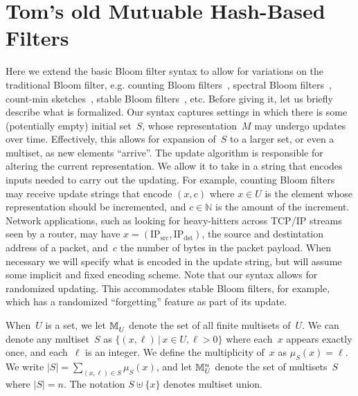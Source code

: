\section{Tom's old Mutuable Hash-Based Filters}
Here we extend the basic Bloom filter syntax to allow for variations on the traditional Bloom filter, e.g. counting Bloom filters~\cite{xxx}, spectral Bloom filters~\cite{xxx}, count-min sketches~\cite{xxx}, stable Bloom filters~\cite{xxx}, etc.   Before giving it, let us briefly describe what is formalized.  Our syntax captures settings in which there is some (potentially empty) initial set~$S$, whose representation~$M$ may undergo updates over time.  Effectively, this allows for expansion of~$S$ to a larger set, or even a multiset, as new elements ``arrive''.    The update algorithm is responsible for altering the current representation.  We allow it to take in a string that encodes inputs needed to carry out the updating.  For example, counting Bloom filters may receive update strings that encode $(x,c)$ where $x \in U$ is the element whose representation should be incremented, and $c \in \mathbb{N}$ is the amount of the increment.  Network applications, such as looking for heavy-hitters across TCP/IP streams seen by a router, may have $x = (\mathrm{IP_{src}},\mathrm{IP_{dst}})$, the source and destintation address of a packet, and~$c$ the number of bytes in the packet payload.  When necessary we will specify what is encoded in the update string, but will assume some implicit and fixed encoding scheme.  Note that our syntax allows for randomized updating.  This accommodates stable Bloom filters, for example, which has a randomized ``forgetting'' feature as part of its update.

When~$U$ is a set, we let $\mathbb{M}_{U}^{}$ denote the set of all finite multisets of~$U$.  We can denote any multiset~$S$ as $\{(x,\ell) \,|\, x \in U, \ell > 0\}$ where each~$x$ appears exactly once, and each~$\ell$ is an integer.  We define the multiplicity of~$x$ as $\mu_S(x) = \ell$.  We write $|S|= \sum_{(x,\ell)\in S}\mu_S(x)$, and let $\mathbb{M}_{U}^{n}$ denote the set of multisets~$S$ where $|S|=n$.   The notation $S \uplus \{x\}$ denotes multiset union.

